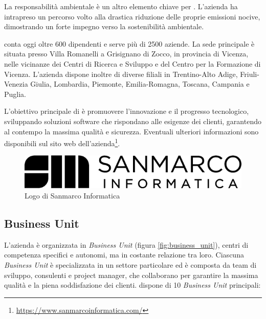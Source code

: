 La responsabilità ambientale è un altro elemento chiave per \myCompany. L'azienda ha intrapreso un percorso volto alla drastica riduzione delle proprie emissioni nocive, dimostrando un forte impegno verso la sostenibilità ambientale.

\myCompany conta oggi oltre 600 dipendenti e serve più di 2500 aziende. La sede principale è situata presso Villa Romanelli a Grisignano di Zocco, in provincia di Vicenza, nelle vicinanze dei Centri di Ricerca e Sviluppo e del Centro per la Formazione di Vicenza. L'azienda dispone inoltre di diverse filiali in Trentino-Alto Adige, Friuli-Venezia Giulia, Lombardia, Piemonte, Emilia-Romagna, Toscana, Campania e Puglia.

L'obiettivo principale di \myCompany è promuovere l'innovazione e il progresso tecnologico, sviluppando soluzioni software che rispondano alle esigenze dei clienti, garantendo al contempo la massima qualità e sicurezza. Eventuali ulteriori informazioni sono disponibili sul sito web dell'azienda\footnote{\url{https://www.sanmarcoinformatica.com/}}.
\begin{figure}[h!]
    \centering
    \includegraphics[width=0.5\columnwidth]{img/logo_sanmarco_informatica.png}
    \caption{Logo di Sanmarco Informatica}
    \label{fig:entanglement}
\end{figure}
\subsection{Business Unit}
L'azienda è organizzata in \emph{Business Unit} (figura \ref{fig:business_unit}), centri di competenza specifici e autonomi, ma in costante relazione tra loro. Ciascuna \emph{Business Unit} è specializzata in un settore particolare ed è composta da team di sviluppo, consulenti e project manager, che collaborano per garantire la massima qualità e la piena soddisfazione dei clienti. \myCompany dispone di 10 \emph{Business Unit} principali:

